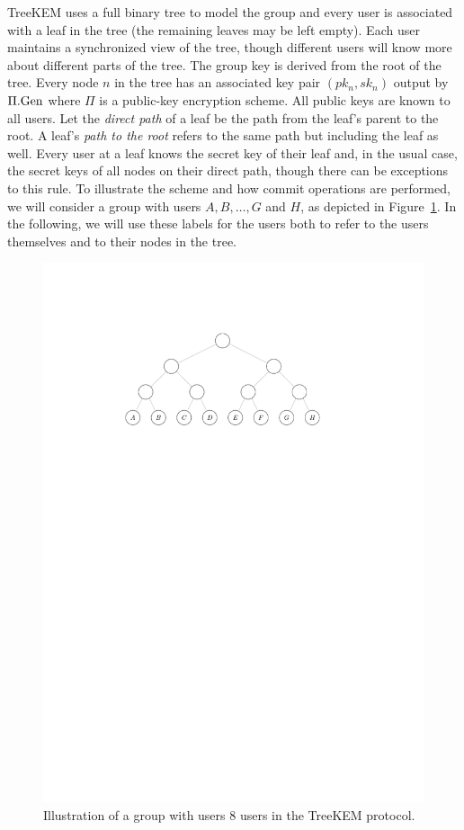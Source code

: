 TreeKEM uses a full binary tree to model the group and every user is associated with a leaf in the tree (the remaining leaves may be left empty). Each user maintains a synchronized view of the tree, though different users will know more about different parts of the tree. The group key is derived from the root of the tree. Every node $n$ in the tree has an associated key pair $(pk_n, sk_n)$ output by $\Pi.\mathrm{Gen}$ where $\Pi$ is a public-key encryption scheme. All public keys are known to all users. Let the \emph{direct path} of a leaf be the path from the leaf's parent to the root. A leaf's \emph{path to the root} refers to the same path but including the leaf as well. Every user at a leaf knows the secret key of their leaf and, in the usual case, the secret keys of all nodes on their direct path, though there can be exceptions to this rule. To illustrate the scheme and how commit operations are performed, we will consider a group with users $A, B, \ldots, G$ and $H$, as depicted in Figure~\ref{fig:treekem-tree}. In the following, we will use these labels for the users both to refer to the users themselves and to their nodes in the tree.

\begin{figure}
	\begin{center}
		\includegraphics{figures/treekem-tree}
	\end{center}
	\caption{Illustration of a group with users 8 users in the TreeKEM protocol.}\label{fig:treekem-tree}
\end{figure}

